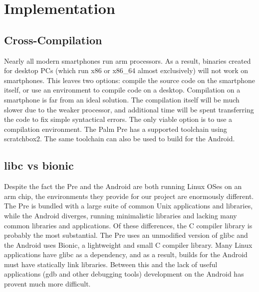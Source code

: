 \section{Implementation}
\subsection{Cross-Compilation}
Nearly all modern smartphones run arm processors.  As a result, binaries created for desktop PCs (which run x86 or x86\_64 almost exclusively) will not work on smartphones.  This leaves two options: compile the source code on the smartphone itself, or use an environment to compile code on a desktop.  Compilation on a smartphone is far from an ideal solution.  The compilation itself will be much slower due to the weaker processor, and additional time will be spent transferring the code to fix simple syntactical errors.  The only viable option is to use a compilation environment.  The Palm Pre has a supported toolchain using scratchbox2.  The same toolchain can also be used to build for the Android.

\subsection{libc vs bionic}
Despite the fact the Pre and the Android are both running Linux OSes on an arm chip, the environments they provide for our project are enormously different.  The Pre is bundled with a large suite of common Unix applications and libraries, while the Android diverges, running minimalistic libraries and lacking many common libraries and applications.  Of these differences, the C compiler library is probably the most substantial. The Pre uses an unmodified version of glibc and the Android uses Bionic, a lightweight and small C compiler library.  Many Linux applications have glibc as a dependency, and as a result, builds for the Android must have statically link libraries.  Between this and the lack of useful applications (gdb and other debugging tools) development on the Android has provent much more difficult.  

